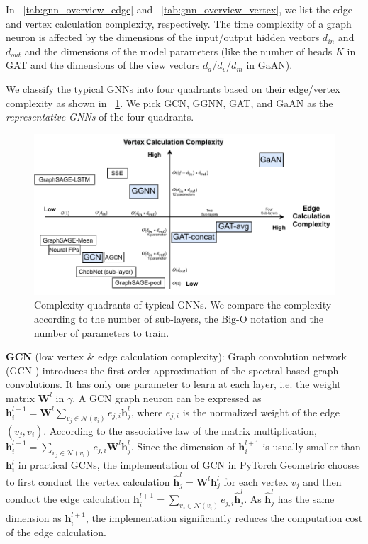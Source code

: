 In \tablename~\ref{tab:gnn_overview_edge} and \tablename~\ref{tab:gnn_overview_vertex}, we list the edge and vertex calculation complexity, respectively.
The time complexity of a graph neuron is affected by the dimensions of the input/output hidden vectors $d_{in}$ and $d_{out}$ and the dimensions of the model parameters (like the number of heads $K$ in GAT and the dimensions of the view vectors $d_a$/$d_v$/$d_m$ in GaAN).

We classify the typical GNNs into four quadrants based on their edge/vertex complexity as shown in \figurename~\ref{fig:gnn_complexity_quadrant}. We pick GCN, GGNN, GAT, and GaAN as the \emph{representative GNNs} of the four quadrants.

\begin{figure}
    \centering
    \includegraphics[width=0.7\columnwidth]{figs/illustration/GNN_complexity_quadrant.pdf}
    \caption{Complexity quadrants of typical GNNs. We compare the complexity according to the number of sub-layers, the Big-O notation and the number of parameters to train.}
    \label{fig:gnn_complexity_quadrant}
\end{figure}

\textbf{GCN} (low vertex \& edge calculation complexity): Graph convolution network (GCN \cite{kipf2017_gcn}) introduces the first-order approximation of the spectral-based graph convolutions.
It has only one parameter to learn at each layer, i.e. the weight matrix $\boldsymbol{W}^l$ in $\gamma$.
A GCN graph neuron can be expressed as $\boldsymbol{h}^{l+1}_i = \boldsymbol{W}^l\sum_{v_j \in \mathcal{N}(v_i)}{e_{j,i}\boldsymbol{h}^l_j}$, where $e_{j,i}$ is the normalized weight of the edge $(v_j, v_i)$.
According to the associative law of the matrix multiplication, $\boldsymbol{h}^{l+1}_i = \sum_{v_j \in \mathcal{N}(v_i)}{e_{j,i}\boldsymbol{W}^l\boldsymbol{h}^l_j}$.
Since the dimension of $\boldsymbol{h}^{l+1}_i$ is usually smaller than $\boldsymbol{h}^l_i$ in practical GCNs, the implementation of GCN in PyTorch Geometric chooses to first conduct the vertex calculation $\hat{\boldsymbol{h}}^l_j = \boldsymbol{W}^l\boldsymbol{h}^l_j$ for each vertex $v_j$ and then conduct the edge calculation $\boldsymbol{h}^{l+1}_i=\sum_{v_j\in\mathcal{N}(v_i)}{e_{j,i}\hat{\boldsymbol{h}}^l_j}$.
As $\hat{\boldsymbol{h}}^l_j$ has the same dimension as $\boldsymbol{h}^{l+1}_i$, the implementation significantly reduces the  computation cost of the edge calculation.

